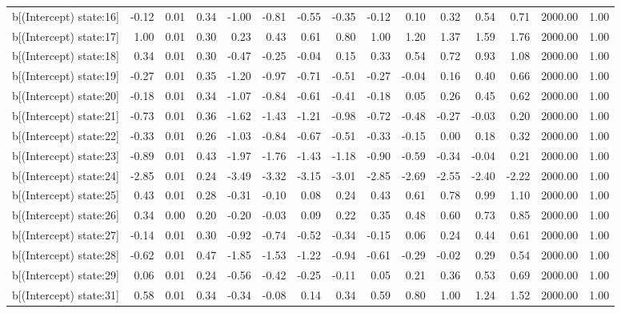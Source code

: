 \begin{table}[ht]
\begin{tabular}{rrrrrrrrrrrrrrr}
  b[(Intercept) state:16] & -0.12 & 0.01 & 0.34 & -1.00 & -0.81 & -0.55 & -0.35 & -0.12 & 0.10 & 0.32 & 0.54 & 0.71 & 2000.00 & 1.00 \\ 
  b[(Intercept) state:17] & 1.00 & 0.01 & 0.30 & 0.23 & 0.43 & 0.61 & 0.80 & 1.00 & 1.20 & 1.37 & 1.59 & 1.76 & 2000.00 & 1.00 \\ 
  b[(Intercept) state:18] & 0.34 & 0.01 & 0.30 & -0.47 & -0.25 & -0.04 & 0.15 & 0.33 & 0.54 & 0.72 & 0.93 & 1.08 & 2000.00 & 1.00 \\ 
  b[(Intercept) state:19] & -0.27 & 0.01 & 0.35 & -1.20 & -0.97 & -0.71 & -0.51 & -0.27 & -0.04 & 0.16 & 0.40 & 0.66 & 2000.00 & 1.00 \\ 
  b[(Intercept) state:20] & -0.18 & 0.01 & 0.34 & -1.07 & -0.84 & -0.61 & -0.41 & -0.18 & 0.05 & 0.26 & 0.45 & 0.62 & 2000.00 & 1.00 \\ 
  b[(Intercept) state:21] & -0.73 & 0.01 & 0.36 & -1.62 & -1.43 & -1.21 & -0.98 & -0.72 & -0.48 & -0.27 & -0.03 & 0.20 & 2000.00 & 1.00 \\ 
  b[(Intercept) state:22] & -0.33 & 0.01 & 0.26 & -1.03 & -0.84 & -0.67 & -0.51 & -0.33 & -0.15 & 0.00 & 0.18 & 0.32 & 2000.00 & 1.00 \\ 
  b[(Intercept) state:23] & -0.89 & 0.01 & 0.43 & -1.97 & -1.76 & -1.43 & -1.18 & -0.90 & -0.59 & -0.34 & -0.04 & 0.21 & 2000.00 & 1.00 \\ 
  b[(Intercept) state:24] & -2.85 & 0.01 & 0.24 & -3.49 & -3.32 & -3.15 & -3.01 & -2.85 & -2.69 & -2.55 & -2.40 & -2.22 & 2000.00 & 1.00 \\ 
  b[(Intercept) state:25] & 0.43 & 0.01 & 0.28 & -0.31 & -0.10 & 0.08 & 0.24 & 0.43 & 0.61 & 0.78 & 0.99 & 1.10 & 2000.00 & 1.00 \\ 
  b[(Intercept) state:26] & 0.34 & 0.00 & 0.20 & -0.20 & -0.03 & 0.09 & 0.22 & 0.35 & 0.48 & 0.60 & 0.73 & 0.85 & 2000.00 & 1.00 \\ 
  b[(Intercept) state:27] & -0.14 & 0.01 & 0.30 & -0.92 & -0.74 & -0.52 & -0.34 & -0.15 & 0.06 & 0.24 & 0.44 & 0.61 & 2000.00 & 1.00 \\ 
  b[(Intercept) state:28] & -0.62 & 0.01 & 0.47 & -1.85 & -1.53 & -1.22 & -0.94 & -0.61 & -0.29 & -0.02 & 0.29 & 0.54 & 2000.00 & 1.00 \\ 
  b[(Intercept) state:29] & 0.06 & 0.01 & 0.24 & -0.56 & -0.42 & -0.25 & -0.11 & 0.05 & 0.21 & 0.36 & 0.53 & 0.69 & 2000.00 & 1.00 \\ 
  b[(Intercept) state:31] & 0.58 & 0.01 & 0.34 & -0.34 & -0.08 & 0.14 & 0.34 & 0.59 & 0.80 & 1.00 & 1.24 & 1.52 & 2000.00 & 1.00 \\ 

\end{tabular}
\end{table}
